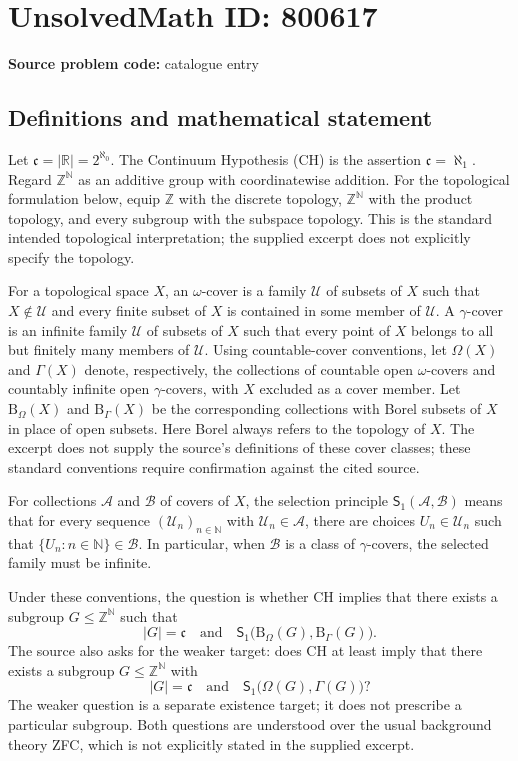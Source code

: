 \documentclass[11pt]{article}
\newcommand{\N}{\mathbb{N}}
\newcommand{\Z}{\mathbb{Z}}
\newcommand{\R}{\mathbb{R}}
\begin{document}
\section*{UnsolvedMath ID: 800617}
\textbf{Source problem code:} catalogue entry
\subsection{Definitions and mathematical statement}
Let \(\mathfrak c=|\R|=2^{\aleph_0}\). The Continuum Hypothesis (CH) is the assertion \(\mathfrak c=\aleph_1\). Regard \(\Z^{\N}\) as an additive group with coordinatewise addition. For the topological formulation below, equip \(\Z\) with the discrete topology, \(\Z^{\N}\) with the product topology, and every subgroup with the subspace topology. This is the standard intended topological interpretation; the supplied excerpt does not explicitly specify the topology.

For a topological space \(X\), an \(\omega\)-cover is a family \(\mathcal U\) of subsets of \(X\) such that \(X\notin\mathcal U\) and every finite subset of \(X\) is contained in some member of \(\mathcal U\). A \(\gamma\)-cover is an infinite family \(\mathcal U\) of subsets of \(X\) such that every point of \(X\) belongs to all but finitely many members of \(\mathcal U\). Using countable-cover conventions, let \(\Omega(X)\) and \(\Gamma(X)\) denote, respectively, the collections of countable open \(\omega\)-covers and countably infinite open \(\gamma\)-covers, with \(X\) excluded as a cover member. Let \(\mathrm B_\Omega(X)\) and \(\mathrm B_\Gamma(X)\) be the corresponding collections with Borel subsets of \(X\) in place of open subsets. Here Borel always refers to the topology of \(X\). The excerpt does not supply the source's definitions of these cover classes; these standard conventions require confirmation against the cited source.

For collections \(\mathcal A\) and \(\mathcal B\) of covers of \(X\), the selection principle \(\mathsf S_1(\mathcal A,\mathcal B)\) means that for every sequence \((\mathcal U_n)_{n\in\N}\) with \(\mathcal U_n\in\mathcal A\), there are choices \(U_n\in\mathcal U_n\) such that \(\{U_n:n\in\N\}\in\mathcal B\). In particular, when \(\mathcal B\) is a class of \(\gamma\)-covers, the selected family must be infinite.

Under these conventions, the question is whether CH implies that there exists a subgroup \(G\leq\Z^{\N}\) such that
\[
 |G|=\mathfrak c
 \quad\text{and}\quad
 \mathsf S_1\bigl(\mathrm B_\Omega(G),\mathrm B_\Gamma(G)\bigr).
\]
The source also asks for the weaker target: does CH at least imply that there exists a subgroup \(G\leq\Z^{\N}\) with
\[
 |G|=\mathfrak c
 \quad\text{and}\quad
 \mathsf S_1\bigl(\Omega(G),\Gamma(G)\bigr)?
\]
The weaker question is a separate existence target; it does not prescribe a particular subgroup. Both questions are understood over the usual background theory ZFC, which is not explicitly stated in the supplied excerpt.
\end{document}
